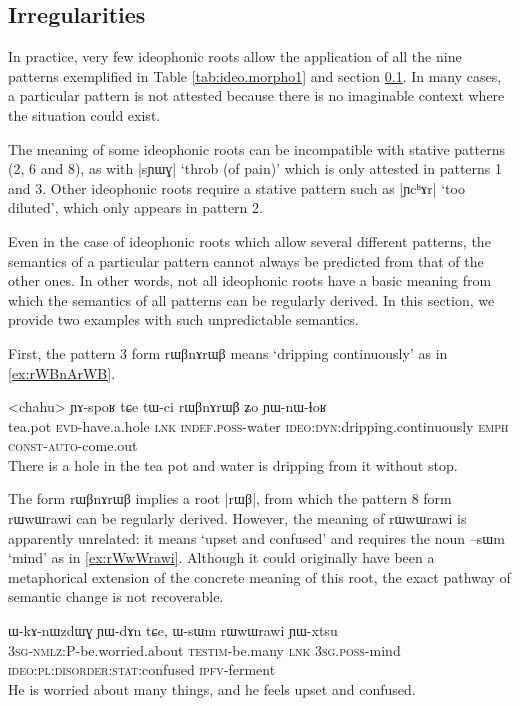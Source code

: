 \documentclass[oldfontcommands,oneside,a4paper,11pt]{article}
\newcommand{\ipa}[1]{{\phon \mbox{#1}}} %
\begin{document}
\subsection{Irregularities} \label{sec:ideo.irregular}
In practice, very few ideophonic roots allow the application of all the nine patterns exemplified in Table \ref{tab:ideo.morpho1}  and section \ref{sec:ideo.irregular}.  In many cases, a particular pattern is not attested because there is no imaginable context where the situation could exist.

The meaning of some ideophonic roots can be incompatible with stative patterns (2, 6 and 8), as with |\ipa{sɲɯɣ}| `throb (of pain)' which is only attested in patterns 1 and 3. Other ideophonic roots require a stative pattern such as |\ipa{ɲcʰɤr}| `too diluted', which only appears in pattern 2.

Even in the case of ideophonic roots which allow several different patterns, the semantics of a particular pattern cannot always be predicted from that of the other ones. In other words, not all ideophonic roots have a basic meaning from which the semantics of all patterns can be regularly derived. In this section, we provide two examples with such unpredictable semantics.

First, the pattern 3 form \ipa{rɯβnɤrɯβ} means `dripping continuously' as in \ref{ex:rWBnArWB}.
  \begin{exe} 
\ex  \label{ex:rWBnArWB}
\gll 
<chahu>  \ipa{ɲɤ-spoʁ}  	\ipa{tɕe}  	\ipa{tɯ-ci}  	\ipa{rɯβnɤrɯβ}  	\ipa{ʑo}  	\ipa{ɲɯ-nɯ-ɬoʁ}   \\
tea.pot \textsc{evd}-have.a.hole \textsc{lnk} \textsc{indef.poss}-water \textsc{ideo:dyn}:dripping.continuously \textsc{emph} \textsc{const-auto}-come.out  \\
\glt There is a hole in the tea pot and water  is dripping from it without stop.
  \end{exe}

The form  \ipa{rɯβnɤrɯβ} implies a root |\ipa{rɯβ}|, from which the pattern 8 form \ipa{rɯwɯrawi} can be regularly derived. However, the meaning of \ipa{rɯwɯrawi} is apparently unrelated: it means `upset and confused' and requires the noun \ipa{--sɯm} `mind' as in \ref{ex:rWwWrawi}. Although it could originally have been a metaphorical extension of the concrete meaning of this root, the  exact pathway of semantic change is not recoverable.

  \begin{exe} 
\ex  \label{ex:rWwWrawi}
\gll 
\ipa{ɯ-kɤ-nɯzdɯɣ}  	\ipa{ɲɯ-dɤn}  	\ipa{tɕe,}  	\ipa{ɯ-sɯm}  	\ipa{rɯwɯrawi}  	\ipa{ɲɯ-xtsu}  	  \\
\textsc{3sg-nmlz:}P-be.worried.about \textsc{testim}-be.many \textsc{lnk} \textsc{3sg.poss}-mind \textsc{ideo:pl:disorder:stat}:confused \textsc{ipfv}-ferment   \\
\glt He is worried about many things, and he feels upset and confused.
  \end{exe}
\end{document}
